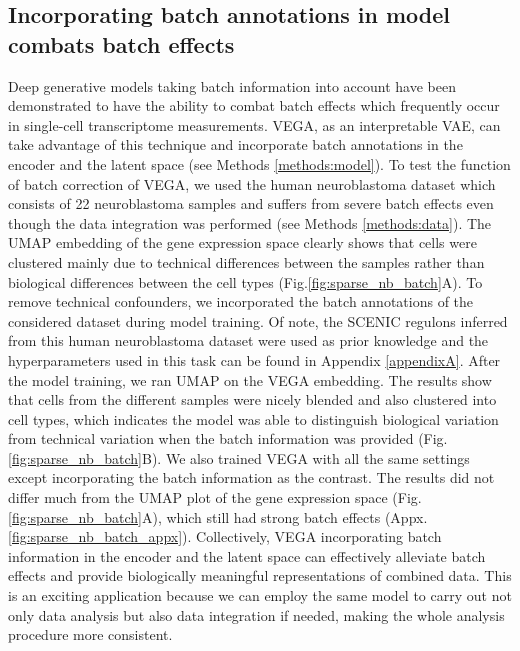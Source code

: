\subsection{Incorporating batch annotations in model combats batch effects}
Deep generative models taking batch information into account have been demonstrated to have the ability to combat batch effects which frequently occur in single-cell transcriptome measurements\cite{Lopez2018}. VEGA, as an interpretable VAE, can take advantage of this technique and incorporate batch annotations in the encoder and the latent space (see Methods \ref{methods:model}). To test the function of batch correction of VEGA, we used the human neuroblastoma dataset\cite{Jansky2021} which consists of 22 neuroblastoma samples and suffers from severe batch effects even though the data integration was performed (see Methods \ref{methods:data}). The UMAP embedding of the gene expression space clearly shows that cells were clustered mainly due to technical differences between the samples rather than biological differences between the cell types (Fig.\ref{fig:sparse_nb_batch}A). To remove technical confounders, we incorporated the batch annotations of the considered dataset during model training. Of note, the SCENIC regulons inferred from this human neuroblastoma dataset\cite{Jansky2021} were used as prior knowledge and the hyperparameters used in this task can be found in Appendix \ref{appendixA}. After the model training, we ran UMAP on the VEGA embedding. The results show that cells from the different samples were nicely blended and also clustered into cell types, which indicates the model was able to distinguish biological variation from technical variation when the batch information was provided (Fig.\ref{fig:sparse_nb_batch}B). We also trained VEGA with all the same settings except incorporating the batch information as the contrast. The results did not differ much from the UMAP plot of the gene expression space (Fig.\ref{fig:sparse_nb_batch}A), which still had strong batch effects (Appx.\ref{fig:sparse_nb_batch_appx}). Collectively, VEGA incorporating batch information in the encoder and the latent space can effectively alleviate batch effects and provide biologically meaningful representations of combined data. This is an exciting application because we can employ the same model to carry out not only data analysis but also data integration if needed, making the whole analysis procedure more consistent.

